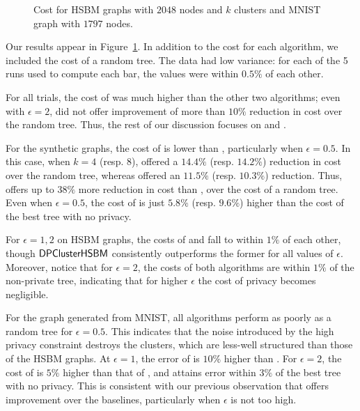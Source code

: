 \begin{figure}
\begin{subfigure}[b]{\linewidth}
    \end{subfigure}
    \caption{Cost for HSBM graphs with $2048$ nodes and $k$ clusters and MNIST graph with $1797$ nodes.}
    \label{fig:exp-results}
    
\end{figure}

Our results appear in Figure~\ref{fig:exp-results}. In addition to the cost for each algorithm, we included the cost of a random tree. The data had low variance: for each of the 5 runs used to compute each bar, the values were within $0.5\%$ of each other.

For all trials, 
the cost of \linkage{} was much higher than the other two algorithms; even with $\epsilon = 2$, \linkage{} did not offer improvement of more than $10\%$ reduction in cost over the random tree. Thus, the rest of our discussion focuses on \dphchsbm{} and \sparsecut{}.

For the synthetic graphs,
the cost of \dphchsbm{} is lower than \sparsecut{}, particularly when $\epsilon = 0.5$. In this case, when $k=4$ (resp. $8$), \dphchsbm{} offered a $14.4\%$ (resp. $14.2\%$) reduction in cost over the random tree, whereas \sparsecut{} offered an $11.5\%$ (resp. $10.3\%$) reduction.
Thus, \dphchsbm{} offers up to $38\%$ more reduction in cost than \sparsecut{}, over the cost of a random tree. Even when $\epsilon = 0.5$, the cost of \dphchsbm{} is just $5.8\%$ (resp. $9.6\%$) higher than the cost of the best tree with no privacy.

For $\epsilon = 1,2$ on HSBM graphs, the costs of \sparsecut{} and \dphchsbm{} fall to within $1\%$ of each other, though $\textsf{DPClusterHSBM}{}$ consistently outperforms the former for all values of $\epsilon$. Moreover, notice that for $\epsilon = 2$, the costs of both algorithms are within $1\%$ of the non-private tree, indicating that for higher $\epsilon$ the cost of privacy becomes negligible.

For the graph generated from MNIST, all algorithms perform as poorly as a random tree for $\epsilon = 0.5$. This indicates that the noise introduced by the high privacy constraint destroys the clusters, which are less-well structured than those of the HSBM graphs. At $\epsilon = 1$, the error of \sparsecut{} is $10\%$ higher than \dphchsbm{}. For $\epsilon = 2$, the cost of \sparsecut{} is $5\%$ higher than that of \dphchsbm{}, and \dphchsbm{} attains error within $3\%$ of the best tree with no privacy. This is consistent with our previous observation that \dphchsbm{} offers improvement over the baselines, particularly when $\epsilon$ is not too high.

